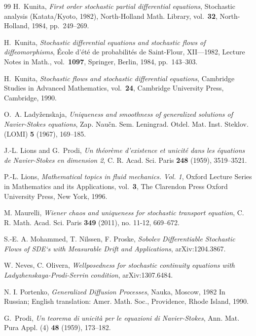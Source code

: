 \documentclass[a4paper,10pt]{article}
\begin{document}
\begin{thebibliography}{99}
H.~Kunita, \textit{First order stochastic partial differential equations},
  Stochastic analysis ({K}atata/{K}yoto, 1982), North-Holland Math. Library,
  vol.~{\bf32}, North-Holland, 1984, pp.~249--269.

H.~Kunita, \textit{Stochastic differential equations and stochastic flows of
  diffeomorphisms}, \'{E}cole d'\'et\'e de probabilit\'es de {S}aint-{F}lour,
  {XII}---1982, Lecture Notes in Math., vol.~{\bf1097}, Springer, Berlin, 1984,
  pp.~143--303.

H.~Kunita, \textit{Stochastic flows and stochastic differential equations},
  Cambridge Studies in Advanced Mathematics, vol.~{\bf24}, Cambridge University
  Press, Cambridge, 1990.

O.~A. Lady{\v{z}}enskaja, \textit{Uniqueness and smoothness of generalized
  solutions of {N}avier-{S}tokes equations}, Zap. Nau\v cn. Sem. Leningrad.
  Otdel. Mat. Inst. Steklov. (LOMI) \textbf{{\bf5}} (1967), 169--185.

J.-L. Lions and G.~Prodi, \textit{Un th\'eor\`eme d'existence et unicit\'e dans
  les \'equations de {N}avier-{S}tokes en dimension 2}, C. R. Acad. Sci. Paris
  \textbf{{\bf248}} (1959), 3519--3521.

P.-L. Lions, \textit{Mathematical topics in fluid mechanics. {V}ol. 1}, Oxford
  Lecture Series in Mathematics and its Applications, vol.~{\bf3}, The
  Clarendon Press Oxford University Press, New York, 1996.

M. Maurelli, \textit{Wiener chaos and uniqueness for stochastic transport equation}, C. R. Math. Acad. Sci. Paris \textbf{349} (2011), no. 11-12, 669--672.

S.-E. A. Mohammed, T. Nilssen, F. Proske, \textit{Sobolev Differentiable Stochastic Flows of SDE`s with Measurable Drift and Applications}, arXiv:1204.3867.

 W. Neves, C. Olivera, \textit{Wellposedness for stochastic continuity equations with Ladyzhenskaya-Prodi-Serrin condition}, arXiv:1307.6484.

N. I. Portenko, \textit{Generalized Diffusion Processes}, Nauka, Moscow, 1982
In Russian; English translation: Amer. Math. Soc., Providence, Rhode Island, 1990.

G.~Prodi, \textit{Un teorema di unicit\`a per le equazioni di {N}avier-{S}tokes},
  Ann. Mat. Pura Appl. (4) \textbf{{\bf 48}} (1959), 173--182.


\end{thebibliography}
\end{document}
